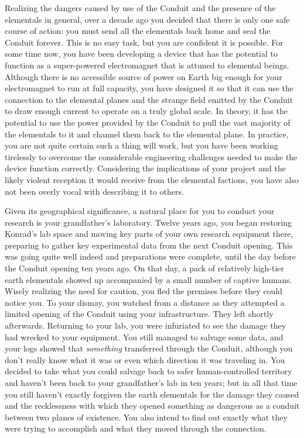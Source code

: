 \documentclass[char]{elementals}
\begin{document}
Realizing the dangers caused by use of the Conduit and the presence of the elementals in general, over a decade ago you decided that there is only one safe course of action: you must send all the elementals back home and seal the Conduit forever. This is no easy task, but you are confident it is possible. For some time now, you have been developing a device that has the potential to function as a super-powered electromagnet that is attuned to elemental beings. Although there is no accessible source of power on Earth big enough for your electromagnet to run at full capacity, you have designed it so that it can use the connection to the elemental planes and the strange field emitted by the Conduit to draw enough current to operate on a truly global scale. In theory, it has the potential to use the power provided by the Conduit to pull the vast majority of the elementals to it and channel them back to the elemental plane. In practice, you are not quite certain such a thing will work, but you have been working tirelessly to overcome the considerable engineering challenges needed to make the device function correctly. Considering the implications of your project and the likely violent reception it would receive from the elemental factions, you have also not been overly vocal with describing it to others.

Given its geographical significance, a natural place for you to conduct your research is your grandfather's laboratory. Twelve years ago, you began restoring Konrad's lab space and moving key parts of your own research equipment there, preparing to gather key experimental data from the next Conduit opening. This was going quite well indeed and preparations were complete, until the day before the Conduit opening ten years ago. On that day, a pack of relatively high-tier earth elementals showed up accompanied by a small number of captive humans. Wisely realizing the need for caution, you fled the premises before they could notice you. To your dismay, you watched from a distance as they attempted a limited opening of the Conduit using your infrastructure. They left shortly afterwards. Returning to your lab, you were infuriated to see the damage they had wrecked to your equipment. You still managed to salvage some data, and your logs showed that \emph{something} transferred through the Conduit, although you don't really know what it was or even which direction it was traveling in. You decided to take what you could salvage back to safer human-controlled territory and haven't been back to your grandfather's lab in ten years; but in all that time you still haven't exactly forgiven the earth elementals for the damage they caused and the recklessness with which they opened something as dangerous as a conduit between two planes of existence. You also intend to find out exactly what they were trying to accomplish and what they moved through the connection.
\end{document}
